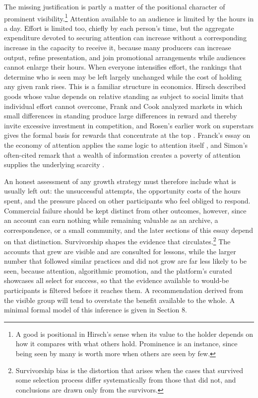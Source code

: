 \documentclass[12pt]{article}
\theoremstyle{plain}
\theoremstyle{definition}
\begin{document}
The missing justification is partly a matter of the positional character of prominent visibility.\footnote{A good is positional in Hirsch's sense when its value to the holder depends on how it compares with what others hold. Prominence is an instance, since being seen by many is worth more when others are seen by few.} Attention available to an audience is limited by the hours in a day. Effort is limited too, chiefly by each person's time, but the aggregate expenditure devoted to securing attention can increase without a corresponding increase in the capacity to receive it, because many producers can increase output, refine presentation, and join promotional arrangements while audiences cannot enlarge their hours. When everyone intensifies effort, the rankings that determine who is seen may be left largely unchanged while the cost of holding any given rank rises. This is a familiar structure in economics. Hirsch described goods whose value depends on relative standing as subject to social limits that individual effort cannot overcome, Frank and Cook analyzed markets in which small differences in standing produce large differences in reward and thereby invite excessive investment in competition, and Rosen's earlier work on superstars gives the formal basis for rewards that concentrate at the top \cite{hirsch1976,frankcook1995,rosen1981}. Franck's essay on the economy of attention applies the same logic to attention itself \cite{franck2019}, and Simon's often-cited remark that a wealth of information creates a poverty of attention supplies the underlying scarcity \cite{simon1971}.

An honest assessment of any growth strategy must therefore include what is usually left out: the unsuccessful attempts, the opportunity costs of the hours spent, and the pressure placed on other participants who feel obliged to respond. Commercial failure should be kept distinct from other outcomes, however, since an account can earn nothing while remaining valuable as an archive, a correspondence, or a small community, and the later sections of this essay depend on that distinction. Survivorship shapes the evidence that circulates.\footnote{Survivorship bias is the distortion that arises when the cases that survived some selection process differ systematically from those that did not, and conclusions are drawn only from the survivors.} The accounts that grew are visible and are consulted for lessons, while the larger number that followed similar practices and did not grow are far less likely to be seen, because attention, algorithmic promotion, and the platform's curated showcases all select for success, so that the evidence available to would-be participants is filtered before it reaches them. A recommendation derived from the visible group will tend to overstate the benefit available to the whole. A minimal formal model of this inference is given in Section 8.
\end{document}
